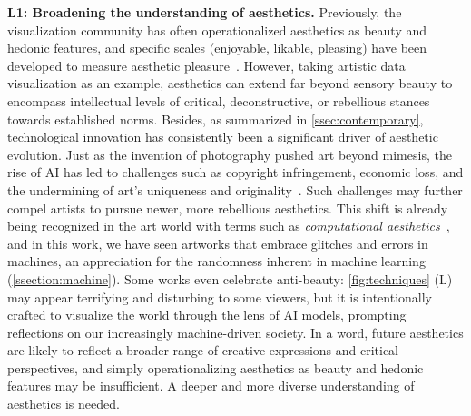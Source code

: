 \textbf{L1: Broadening the understanding of aesthetics.}
Previously, the visualization community has often operationalized aesthetics as beauty and hedonic features, and specific scales (\eg enjoyable, likable, pleasing) have been developed to measure aesthetic pleasure~\cite{he2022beauvis,stoll2024investigating}. 
However, taking artistic data visualization as an example, aesthetics can extend far beyond sensory beauty to encompass intellectual levels of critical, deconstructive, or rebellious stances towards established norms. 
Besides, as summarized in \autoref{ssec:contemporary}, technological innovation has consistently been a significant driver of aesthetic evolution. Just as the invention of photography pushed art beyond mimesis, the rise of AI has led to challenges such as copyright infringement, economic loss, and the undermining of art's uniqueness and originality~\cite{jiang2023ai}. Such challenges may further compel artists to pursue newer, more rebellious aesthetics. This shift is already being recognized in the art world with terms such as \textit{computational aesthetics}~\cite{galanter2012computational}, and in this work, we have seen artworks that embrace glitches and errors in machines, an appreciation for the randomness inherent in machine learning (\eg \autoref{ssection:machine}). Some works even celebrate anti-beauty: \autoref{fig:techniques} (L) may appear terrifying and disturbing to some viewers, but it is intentionally crafted to visualize the world through the lens of AI models, prompting reflections on our increasingly machine-driven society. In a word, future aesthetics are likely to reflect a broader range of creative expressions and critical perspectives, and simply operationalizing aesthetics as beauty and hedonic features may be insufficient. A deeper and more diverse understanding of aesthetics is needed.

